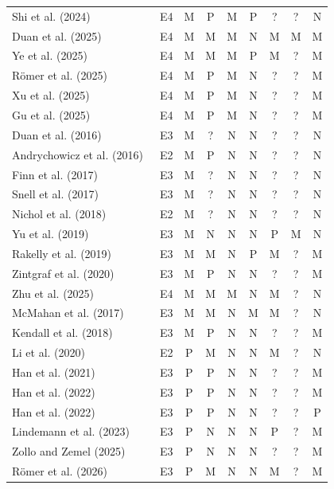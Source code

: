 \documentclass[10pt,a4paper]{article}
\begin{document}
\begin{longtable}{@{}>{\raggedright\arraybackslash}p{5.5cm}cccccccc@{}}
Shi et al. (2024)~\cite{Shi2024} & E4 & M & P & M & P & ? & ? & N \\
Duan et al. (2025)~\cite{Duan2025} & E4 & M & M & M & N & M & M & M \\
Ye et al. (2025)~\cite{Ye2025} & E4 & M & M & M & P & M & ? & M \\
R\"omer et al. (2025)~\cite{Romer2025} & E4 & M & P & M & N & ? & ? & M \\
Xu et al. (2025)~\cite{Xu2025} & E4 & M & P & M & N & ? & ? & M \\
Gu et al. (2025)~\cite{Gu2025} & E4 & M & P & M & N & ? & ? & M \\
Duan et al. (2016)~\cite{Duan2016} & E3 & M & ? & N & N & ? & ? & N \\
Andrychowicz et al. (2016)~\cite{Andrychowicz2016} & E2 & M & P & N & N & ? & ? & N \\
Finn et al. (2017)~\cite{Finn2017} & E3 & M & ? & N & N & ? & ? & N \\
Snell et al. (2017)~\cite{Snell2017} & E3 & M & ? & N & N & ? & ? & N \\
Nichol et al. (2018)~\cite{Nichol2018} & E2 & M & ? & N & N & ? & ? & N \\
Yu et al. (2019)~\cite{Yu2019} & E3 & M & N & N & N & P & M & N \\
Rakelly et al. (2019)~\cite{Rakelly2019} & E3 & M & M & N & P & M & ? & M \\
Zintgraf et al. (2020)~\cite{Zintgraf2020} & E3 & M & P & N & N & ? & ? & M \\
Zhu et al. (2025)~\cite{Zhu2025} & E4 & M & M & M & N & M & ? & N \\
McMahan et al. (2017)~\cite{McMahan2017} & E3 & M & M & N & M & M & ? & N \\
Kendall et al. (2018)~\cite{Kendall2018} & E3 & M & P & N & N & ? & ? & M \\
Li et al. (2020)~\cite{Li2020} & E2 & P & M & N & N & M & ? & N \\
Han et al. (2021)~\cite{Han2021} & E3 & P & P & N & N & ? & ? & M \\
Han et al. (2022)~\cite{Han2022a} & E3 & P & P & N & N & ? & ? & M \\
Han et al. (2022)~\cite{Han2022b} & E3 & P & P & N & N & ? & ? & P \\
Lindemann et al. (2023)~\cite{Lindemann2023} & E3 & P & N & N & N & P & ? & M \\
Zollo and Zemel (2025)~\cite{Zollo2025} & E3 & P & N & N & N & ? & ? & M \\
R\"omer et al. (2026)~\cite{Romer2026a} & E3 & P & M & N & N & M & ? & M \\

\end{longtable}
\end{document}
